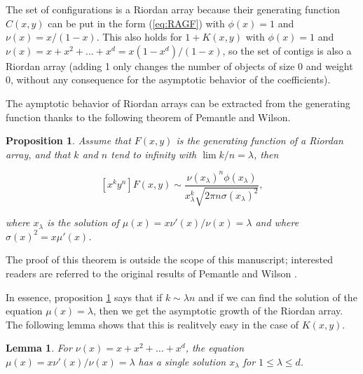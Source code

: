 \documentclass{article}
\newtheorem{lemma}{Lemma}
\newtheorem{proposition}{Proposition}
\begin{document}
The set of configurations is a Riordan array because their generating
function $C(x,y)$ can be put in the form (\ref{eq:RAGF}) with $\phi(x) =
1$ and $\nu(x) = x/(1-x)$. This also holds for $1+K(x,y)$ with $\phi(x) =
1$ and $\nu(x) = x+x^2+\ldots+x^d = x(1-x^d)/(1-x)$, so the set of contigs
is also a Riordan array (adding 1 only changes the number of objects of
size 0 and weight 0, without any consequence for the asymptotic behavior
of the coefficients).

The aymptotic behavior of Riordan arrays can be extracted from the
generating function thanks to the following theorem of Pemantle and
Wilson.

\begin{proposition}
\label{th:PW}
Assume that $F(x,y)$ is the generating function of a Riordan array, and
that $k$ and $n$ tend to infinity with $\lim k/n = \lambda$, then

\begin{equation}
\label{eq:assRA}
[x^ky^n]F(x,y) \sim \frac{\nu(x_\lambda)^n\phi(x_\lambda)}
  {x_\lambda^k\sqrt{2\pi n \sigma(x_\lambda)^2}},
\end{equation}

\noindent
where $x_\lambda$ is the solution of $\mu(x) = x\nu'(x)/\nu(x) = \lambda$
and where $\sigma(x)^2 = x \mu'(x)$.
\end{proposition}

The proof of this theorem is outside the scope of this manuscript;
interested readers are referred to the original results of Pemantle and
Wilson \cite{PemWil02,AnalComb2013}.

In essence, proposition \ref{th:PW} says that if $k \sim \lambda n$ and if
we can find the solution of the equation $\mu(x) = \lambda$, then we get
the asymptotic growth of the Riordan array. The following lemma shows that
this is realitvely easy in the case of $K(x,y)$.

\begin{lemma}
\label{th:mu}
For $\nu(x) = x+x^2+\ldots+x^d$, the equation $\mu(x) = x\nu'(x)/\nu(x) =
\lambda$ has a single solution $x_\lambda$ for $1 \leq \lambda \leq d$.
\end{lemma}
\end{document}
